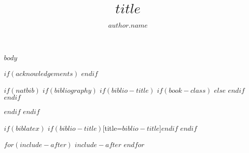 \documentclass[a4paper,11pt,one_column,printwatermark=$if(watermark)$$watermark$$else$false$endif$]{modeloLEA}
\title{$title$}
\author[$author.affiliation$]{$author.name$}
\affil[$address.code$]{$address.address$}
\begin{document}
\verticaladjustment{-2pt}

\maketitle
\thispagestyle{firststyle}


$body$

$if(acknowledgements)$
\showacknow
$endif$


$if(natbib)$
$if(bibliography)$
$if(biblio-title)$
$if(book-class)$
\renewcommand\bibname{$biblio-title$}
$else$
\renewcommand\refname{$biblio-title$}
$endif$
$endif$


$endif$
$endif$

$if(biblatex)$
\printbibliography$if(biblio-title)$[title=$biblio-title$]$endif$
$endif$

$for(include-after)$
$include-after$
$endfor$
\end{document}
